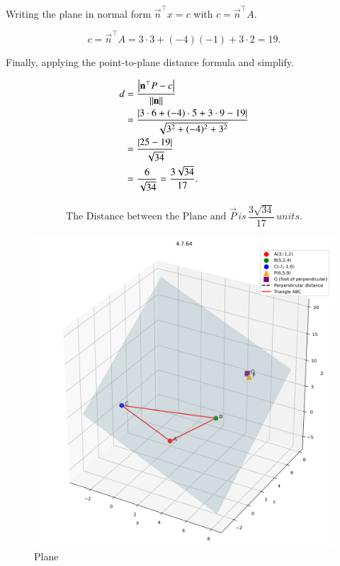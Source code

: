 \documentclass[journal]{IEEEtran}
\begin{document}
Writing the plane in normal form $\vec{n}^\top x = c$ with $c=\vec{n}^\top A$.

\begin{equation}
c=\vec{n}^\top A=3\cdot 3+(-4)(-1)+3\cdot 2=19.
\end{equation}

\newpage

Finally, applying the point-to-plane distance formula and simplify.

\begin{align}
d &= \frac{\left\vert\mathbf{n}^\top P - c\right\vert}{\left\lVert\mathbf{n}\right\rVert}\\
&= \frac{\left\vert3\cdot 6+(-4)\cdot 5+3\cdot 9-19\right\vert}{\sqrt{3^2+(-4)^2+3^2}}\\
&= \frac{\left\vert25-19\right\vert}{\sqrt{34}}\\
&= \frac{6}{\sqrt{34}}=\frac{3\sqrt{34}}{17}.
\end{align}

\begin{align}
    \boxed{\text{The Distance between the Plane and } \vec{P} \, is \, \dfrac{3\sqrt{34}}{17} \, units.}
\end{align}

\begin{figure}[htbp]
    \centering
    \includegraphics[width=\columnwidth]{figs/fig1.png}
    \caption{Plane}
    \label{fig:fig/fig1.png}
\end{figure}
\end{document}
